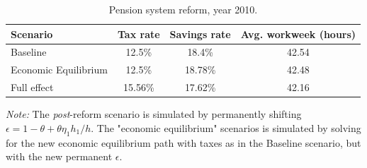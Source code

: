\begin{table}[!htb]
\centering
\begin{threeparttable}
\caption{Pension system reform, year 2010.}
\label{table:Argentina:Universal}
\begin{tabular}{lccc}
\toprule
\textbf{Scenario} & \textbf{Tax rate} & \textbf{Savings rate} & \textbf{Avg. workweek (hours)}\\
\midrule 
Baseline & 12.5\% & 18.4\% & 42.54 \\[1ex]
Economic Equilibrium & 12.5\% & 18.78\% & 42.48 \\[1ex]
Full effect & 15.56\% & 17.62\% & 42.16 \\[1ex]
\bottomrule
\end{tabular}
\begin{tablenotes}
\footnotesize
\item\textit{Note:} The \textit{post}-reform scenario is simulated by permanently shifting $\epsilon = 1-\theta + \theta \eta_1 h_1 / h$. The "economic equilibrium" scenarios is simulated by solving for the new economic equilibrium path with taxes as in the Baseline scenario, but with the new permanent $\epsilon$.   
\end{tablenotes}
\end{threeparttable}
\end{table}
